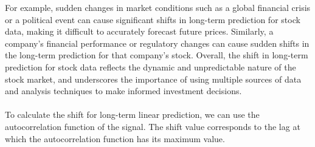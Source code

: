 For example, sudden changes in market conditions such as a global financial crisis or a political event can cause
significant shifts in long-term prediction for stock data, making it difficult to accurately forecast future prices.
Similarly, a company's financial performance or regulatory changes can cause sudden shifts in the long-term prediction
for that company's stock. Overall, the shift in long-term prediction for stock data reflects the dynamic and
unpredictable nature of the stock market, and underscores the importance of using multiple sources of data and analysis
techniques to make informed investment decisions.\\
\\
To calculate the shift for long-term linear prediction, we can use the autocorrelation function of the signal.
The shift value corresponds to the lag at which the autocorrelation function has its maximum value.


